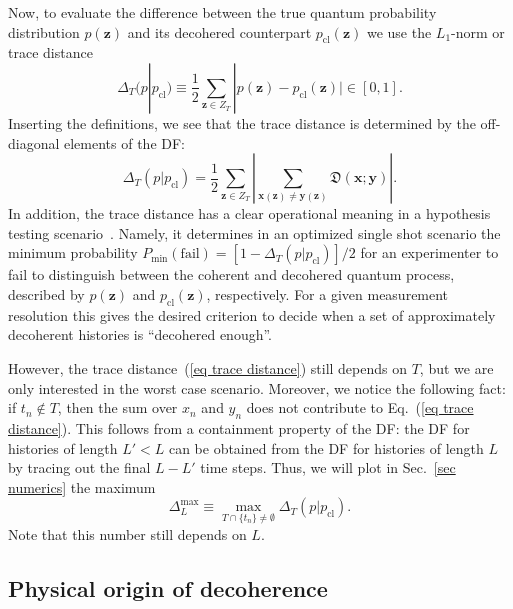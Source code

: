 \documentclass[pre,onecolumn,12pt,aps,longbibliography,nofootinbib]{revtex4-2}
\newcommand{\bb}[1]{\textbf{#1}}
\newcommand{\mf}[1]{{\mathfrak{#1}}}
\newcommand{\new}[1]{#1}
\begin{document}
Now, to evaluate the difference between the true quantum probability distribution $p(\bb z)$ and its decohered counterpart $p_\text{cl}(\bb z)$ we use the $L_1$-norm or trace distance
\begin{equation}\label{eq trace distance}
 \Delta_T(p|p_\text{cl}) \equiv \frac{1}{2}\sum_{\bb z\in Z_T} |p(\bb z)-p_\text{cl}(\bb z)| \in[0,1].
\end{equation}
Inserting the definitions, we see that the trace distance is determined by the off-diagonal elements of the DF:
\begin{equation}
 \Delta_T(p|p_\text{cl}) = \frac{1}{2}\sum_{\bb z\in Z_T} \left|\sum_{\bb x(\bb z)\neq\bb y(\bb z)} \mf{D}(\bb x;\bb y)\right|.
\end{equation}
In addition, the trace distance has a clear operational meaning in a hypothesis testing scenario~\cite{WildeBook2019}. Namely, it determines in an optimized single shot scenario the minimum probability $P_\text{min}(\text{fail}) = [1-\Delta_T(p|p_\text{cl})]/2$ for an experimenter to fail to distinguish between the coherent and decohered quantum process, described by $p(\bb z)$ and $p_\text{cl}(\bb z)$, respectively. For a given measurement resolution this gives the desired criterion to decide when a set of approximately decoherent histories is ``decohered enough''.

However, the trace distance~(\ref{eq trace distance}) still depends on $T$, but we are only interested in the worst case scenario. Moreover, we notice the following fact: if $t_n\notin T$, then the sum over $x_n$ and $y_n$ does not contribute to Eq.~(\ref{eq trace distance}). This follows from a {containment} property of the DF: the DF for histories of length $L'<L$ can be obtained from the DF for histories of length $L$ by tracing out the final $L-L'$ time steps. Thus, we will plot in Sec.~\ref{sec numerics} the maximum
\begin{equation}\label{eq TD max}
 \Delta^\text{max}_L \equiv \max_{T\cap\{t_n\}\neq\emptyset} \Delta_T(p|p_\text{cl}).
\end{equation}
Note that this number still depends on $L$.

\subsection{\new{Physical origin of decoherence}}
\label{sec physical origin}
\end{document}
